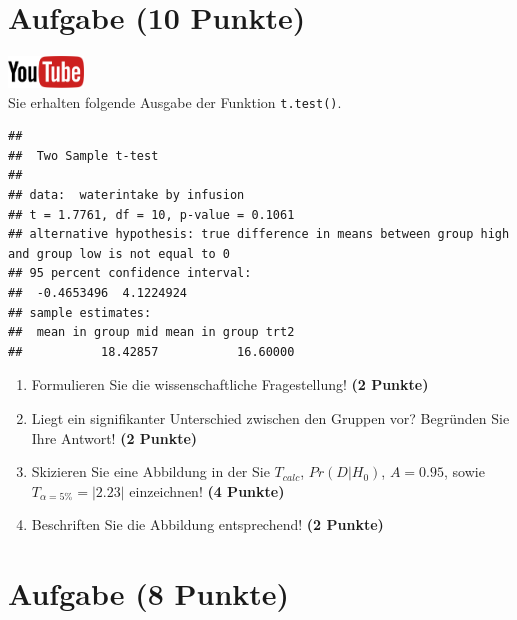 \documentclass[a4paper, 10pt]{scrartcl}\usepackage[]{graphicx}\usepackage[]{xcolor}
\makeatletter
\newenvironment{kframe}{%
 \def\at@end@of@kframe{}%
 \ifinner\ifhmode%
  \def\at@end@of@kframe{\end{minipage}}%
  \begin{minipage}{\columnwidth}%
 \fi\fi%
 \def\FrameCommand##1{\hskip\@totalleftmargin \hskip-\fboxsep
 \colorbox{shadecolor}{##1}\hskip-\fboxsep
     \hskip-\linewidth \hskip-\@totalleftmargin \hskip\columnwidth}%
 \MakeFramed {\advance\hsize-\width
   \@totalleftmargin\z@ \linewidth\hsize
   \@setminipage}}%
 {\par\unskip\endMakeFramed%
 \at@end@of@kframe}
\newenvironment{knitrout}{}{} %
\makeatother
\begin{document}
\section{Aufgabe \hfill (10 Punkte)}

\hfill\href{https://youtu.be/exDo7AyHl4Q}{\includegraphics[width =
  2cm]{img/youtube}}\\[1Ex]

Sie erhalten folgende \Rlogo Ausgabe der Funktion \texttt{t.test()}.

\begin{knitrout}
\color{fgcolor}\begin{kframe}
\begin{verbatim}
## 
## 	Two Sample t-test
## 
## data:  waterintake by infusion
## t = 1.7761, df = 10, p-value = 0.1061
## alternative hypothesis: true difference in means between group high and group low is not equal to 0
## 95 percent confidence interval:
##  -0.4653496  4.1224924
## sample estimates:
##  mean in group mid mean in group trt2 
##           18.42857           16.60000
\end{verbatim}
\end{kframe}
\end{knitrout}


\begin{enumerate}
  \item Formulieren Sie die wissenschaftliche Fragestellung! \textbf{(2
Punkte)}
\item Liegt ein signifikanter Unterschied zwischen den Gruppen vor?
  Begr{\"u}nden Sie Ihre Antwort! \textbf{(2 Punkte)}
\item Skizieren Sie eine Abbildung in der Sie $T_{calc}$, $Pr(D|H_0)$, $A=0.95$,
  sowie $T_{\alpha=5\%} = |2.23|$ einzeichnen! \textbf{(4 Punkte)}
\item Beschriften Sie die Abbildung entsprechend! \textbf{(2 Punkte)}  
\end{enumerate} 
\clearpage

\section{Aufgabe \hfill (8 Punkte)}
\end{document}
